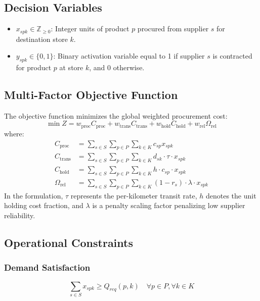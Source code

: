 \documentclass[conference]{IEEEtran}
\begin{document}
\subsection{Decision Variables}
\begin{itemize}
    \item $x_{spk} \in \mathbb{Z}_{\ge 0}$: Integer units of product $p$ procured from supplier $s$ for destination store $k$.
    \item $y_{spk} \in \{0, 1\}$: Binary activation variable equal to 1 if supplier $s$ is contracted for product $p$ at store $k$, and 0 otherwise.
\end{itemize}

\subsection{Multi-Factor Objective Function}
The objective function minimizes the global weighted procurement cost:
\begin{equation}
\min Z = w_{\text{proc}} C_{\text{proc}} + w_{\text{trans}} C_{\text{trans}} + w_{\text{hold}} C_{\text{hold}} + w_{\text{rel}} \Omega_{\text{rel}}
\label{eq:objective}
\end{equation}
where:
\begin{align}
C_{\text{proc}} &= \sum_{s \in S} \sum_{p \in P} \sum_{k \in K} c_{sp} x_{spk} \label{eq:c_proc} \\
C_{\text{trans}} &= \sum_{s \in S} \sum_{p \in P} \sum_{k \in K} d_{sk} \cdot \tau \cdot x_{spk} \label{eq:c_trans} \\
C_{\text{hold}} &= \sum_{s \in S} \sum_{p \in P} \sum_{k \in K} h \cdot c_{sp} \cdot x_{spk} \label{eq:c_hold} \\
\Omega_{\text{rel}} &= \sum_{s \in S} \sum_{p \in P} \sum_{k \in K} (1 - r_s) \cdot \lambda \cdot x_{spk} \label{eq:c_rel}
\end{align}
In the formulation, $\tau$ represents the per-kilometer transit rate, $h$ denotes the unit holding cost fraction, and $\lambda$ is a penalty scaling factor penalizing low supplier reliability.

\subsection{Operational Constraints}
\subsubsection{Demand Satisfaction}
\begin{equation}
\sum_{s \in S} x_{spk} \ge Q_{req}(p, k) \quad \forall p \in P, \forall k \in K
\label{eq:con_demand}
\end{equation}
\end{document}

